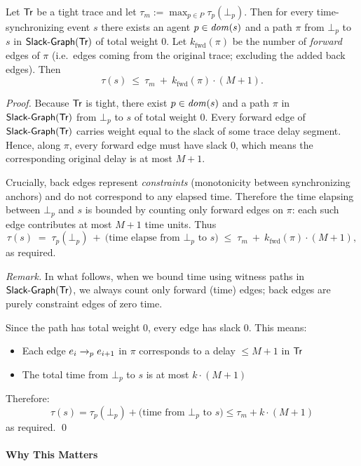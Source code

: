 \begin{lemma}\label{lem:tight-run-bound}
Let $\textsf{Tr}$ be a tight trace and let $\tau_m := \max_{p\in P}\tau_p(\bot_p)$.
Then for every time-synchronizing event $s$ there exists an agent $p\in\mathit{dom}(s)$ and
a path $\pi$ from $\bot_p$ to $s$ in $\mathrm{\textsf{Slack-Graph}}(\textsf{Tr})$ of total weight $0$.
Let $k_{\mathrm{fwd}}(\pi)$ be the number of \emph{forward} edges of $\pi$
(i.e.\ edges coming from the original trace; excluding the added back edges).
Then
\[
\tau(s)\ \le\ \tau_m\ +\ k_{\mathrm{fwd}}(\pi)\cdot (M+1).
\]
\end{lemma}

\begin{proof}
Because $\textsf{Tr}$ is tight, there exist $p\in\mathit{dom}(s)$ and a path $\pi$ in $\mathrm{\textsf{Slack-Graph}}(\textsf{Tr})$ from $\bot_p$ to $s$
of total weight $0$.
Every forward edge of $\mathrm{\textsf{Slack-Graph}}(\textsf{Tr})$ carries weight equal to the slack of some trace delay segment.
Hence, along $\pi$, every forward edge must have slack $0$, which means the corresponding original delay
is at most $M{+}1$.

Crucially, back edges represent \emph{constraints} (monotonicity between synchronizing anchors) and do not
correspond to any elapsed time.
Therefore the time elapsing between $\bot_p$ and $s$ is bounded by counting only forward edges on $\pi$:
each such edge contributes at most $M{+}1$ time units.
Thus
\[
\tau(s) \;=\; \tau_p(\bot_p)\ +\ \text{(time elapse from $\bot_p$ to $s$)}
\;\le\; \tau_m\ +\ k_{\mathrm{fwd}}(\pi)\cdot (M+1),
\]
as required.

\noindent\emph{Remark.} In what follows, when we bound time using witness paths in $\mathrm{\textsf{Slack-Graph}}(\textsf{Tr})$,
we always count only forward (time) edges; back edges are purely constraint edges of zero time.

Since the path has total weight 0, every edge has slack 0. This means:
\begin{itemize}
\item Each edge $e_i \xrightarrow{}_p e_{i+1}$ in $\pi$ corresponds to a delay $\leq M+1$ in $\textsf{Tr}$
\item The total time from $\bot_p$ to $s$ is at most $k \cdot (M+1)$
\end{itemize}

Therefore:
\[
\tau(s) = \tau_p(\bot_p) + \text{(time from $\bot_p$ to $s$)} \leq \tau_m + k \cdot (M+1)
\]
as required. \qed
\end{proof}

\paragraph*{Why This Matters}

